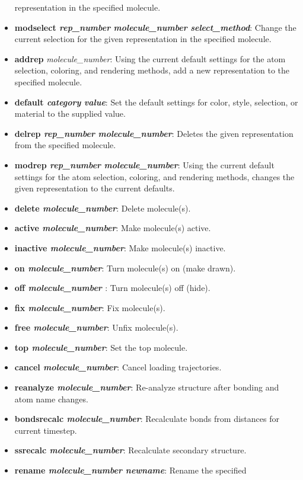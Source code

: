 \begin{itemize}
representation in the specified molecule.
    \item {\bf  modselect {\it rep\_number} {\it molecule\_number} {\it
select\_method}}: Change the current selection for the given representation
in the specified molecule.
    \item {{\bf  addrep} {\it molecule\_number}}: Using the current default 
           settings for the atom selection, coloring, and rendering methods, 
           add a new representation to the specified molecule.
    \item {\bf  default {\it category} {\it value}}: Set the default settings for color, style, selection, or material to the supplied value.
    \item {\bf  delrep {\it rep\_number} {\it molecule\_number}}: Deletes the
given representation from the specified molecule.
    \item {\bf  modrep {\it rep\_number} {\it molecule\_number}}: Using the 
    current default settings for the atom selection, coloring, 
    and rendering methods, changes the given representation to the 
    current defaults.
    \item {\bf  delete  {\it molecule\_number}}: Delete molecule(s).
    \item {\bf  active {\it molecule\_number}}: Make molecule(s) active.
    \item {\bf  inactive {\it  molecule\_number}}: Make molecule(s) inactive.
    \item {\bf  on {\it molecule\_number}}: Turn molecule(s) on (make drawn).
    \item {\bf  off {\it  molecule\_number }}: Turn molecule(s) off (hide).
    \item {\bf  fix {\it  molecule\_number}}: Fix molecule(s).
    \item {\bf  free {\it  molecule\_number}}: Unfix molecule(s).
    \item {\bf  top {\it molecule\_number}}: Set the top molecule.
    \item {\bf  cancel {\it molecule\_number}}: Cancel loading trajectories.
    \item {\bf  reanalyze {\it molecule\_number}}: Re-analyze structure after bonding and atom name changes.
    \item {\bf  bondsrecalc {\it molecule\_number}}: Recalculate bonds from distances for current timestep.
    \item {\bf  ssrecalc {\it molecule\_number}}: Recalculate secondary structure.
    \item {\bf  rename {\it molecule\_number newname}}: Rename the specified 

\end{itemize}
